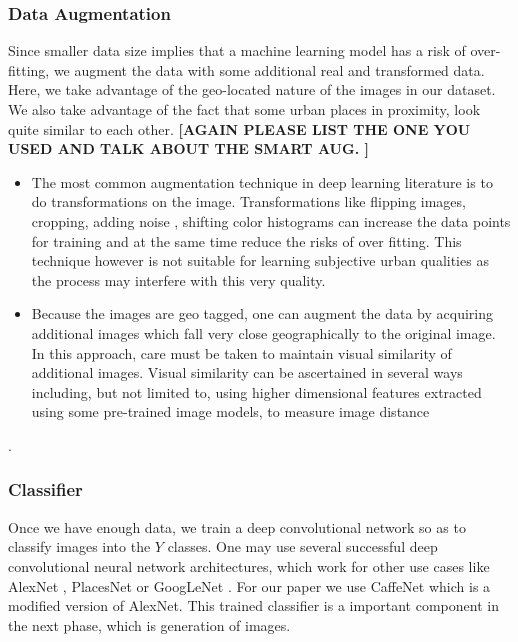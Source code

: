 \subsubsection{Data Augmentation}
Since smaller data size implies that a machine learning model has a risk of over-fitting,%
 we augment the data with some additional real and transformed data. Here, we take advantage of the geo-located nature of the images in our dataset. We also take advantage of the fact that some urban places in proximity, look quite similar to each other.  %
 \textbf{[AGAIN PLEASE LIST THE ONE YOU USED AND TALK ABOUT THE SMART AUG. ]}
\begin{itemize}
	\item The most common augmentation technique in deep learning literature is to do transformations on the image. Transformations like flipping images, cropping, adding noise , shifting color histograms can increase the data points for training and at the same time reduce the risks of over fitting. This technique however is not suitable for learning subjective urban qualities as the process may interfere with this very quality.
	\item Because the images are geo tagged, one can augment the data by acquiring additional images which fall very close geographically to the original image. In this approach, care must be taken to maintain visual similarity of additional images. Visual similarity can be ascertained in several ways including, but not limited to, using higher dimensional features extracted using some pre-trained image models, to measure image distance
\end{itemize}. 

\subsubsection{Classifier}
\label{sec:classifier}
Once we have enough data, we train a deep convolutional network so as to classify images into the $Y$ classes. One may use several successful deep convolutional neural network architectures, which work for other use cases like AlexNet \cite{krizhevsky2012imagenet} , PlacesNet \cite{zhou2014learning} or GoogLeNet \cite{szegedy2015going}.  For our paper we use CaffeNet which is a modified version of AlexNet. This trained classifier is a important component in the next phase, which is generation of images. 


